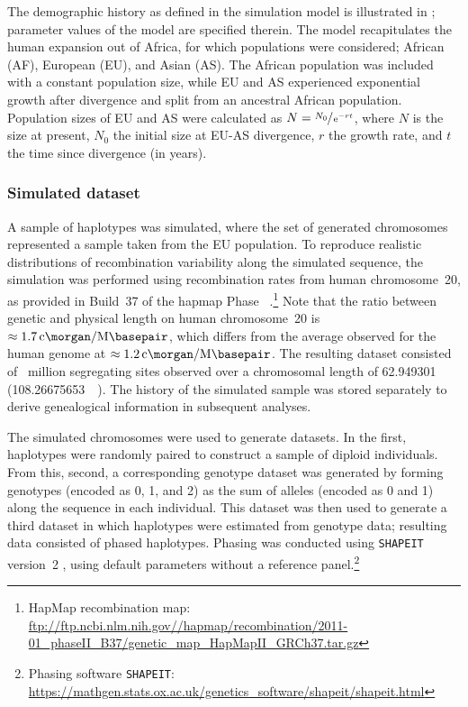 %

%

The demographic history as defined in the simulation model is illustrated in ; parameter values of the model are specified therein.
The model recapitulates the human expansion out of Africa, for which  populations were considered; African (AF), European (EU), and Asian (AS).
The African population was included with a constant population size, while EU and AS experienced exponential growth after divergence and split from an ancestral African population.
Population sizes of EU and AS were calculated as ${N = \sfrac{N_0}{\,\mathrm{e}^{-r t}}}$, where $N$ is the size at present, $N_0$ the initial size at EU-AS divergence, $r$ the growth rate, and $t$ the time since divergence (in years).


%
\subsubsection{Simulated dataset}\label{sec:simdata}
%

A sample of  haplotypes was simulated, where the set of generated chromosomes represented a sample taken from the EU population.
To reproduce realistic distributions of recombination variability along the simulated sequence, the simulation was performed using recombination rates from human chromosome~20, as provided in Build~37 of the \gls{hapmap} Phase~ \citep{Frazer:2007kha, InternationalHapMapConsortium:2010en}.\footnote{HapMap recombination map: \url{ftp://ftp.ncbi.nlm.nih.gov//hapmap/recombination/2011-01_phaseII_B37/genetic_map_HapMapII_GRCh37.tar.gz} }
Note that the ratio between genetic and physical length on human chromosome~20 is $\approx\SI[per-mode=fraction,round-precision=1]{1.7}{\centi\morgan\per\mega\basepair}$, which differs from the average observed for the human genome at $\approx\SI[per-mode=fraction,round-precision=1]{1.2}{\centi\morgan\per\mega\basepair}$.
The resulting dataset consisted of ~million segregating sites observed over a chromosomal length of \SI{62.949301}{\mega\basepair} (\SI{108.26675653}{\centi\morgan}).
The history of the simulated sample was stored separately to derive genealogical information in subsequent analyses.

The simulated chromosomes were used to generate  datasets.
In the first, haplotypes were randomly paired to construct a sample of  diploid individuals.
From this, second, a corresponding genotype dataset was generated by forming genotypes (encoded as 0, 1, and 2) as the sum of alleles (encoded as 0 and 1) along the sequence in each individual.
This dataset was then used to generate a third dataset in which haplotypes were estimated from genotype data;
\ie resulting data consisted of phased haplotypes.
Phasing was conducted using \texttt{SHAPEIT} version~2 \citep{Delaneau:2008dk,Delaneau:2013hi}, using default parameters without a reference panel.\footnote{Phasing software \texttt{SHAPEIT}: \url{https://mathgen.stats.ox.ac.uk/genetics_software/shapeit/shapeit.html} }


